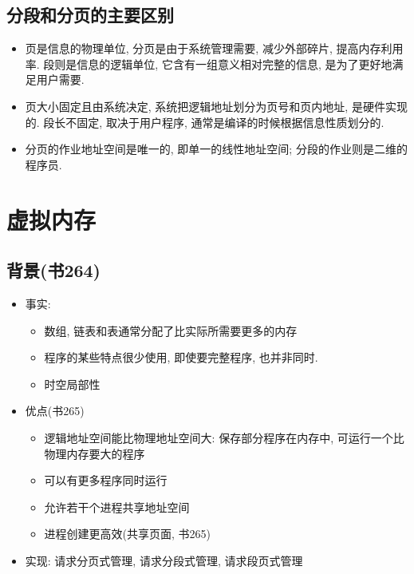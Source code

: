 \documentclass[a4paper, UTF8]{article}
\begin{document}
\subsection{分段和分页的主要区别}
\begin{itemize}
\item 页是信息的物理单位, 分页是由于系统管理需要, 减少外部碎片, 提高内存利用率. 段则是信息的逻辑单位, 它含有一组意义相对完整的信息, 是为了更好地满足用户需要.
\item 页大小固定且由系统决定, 系统把逻辑地址划分为页号和页内地址, 是硬件实现的. 段长不固定, 取决于用户程序, 通常是编译的时候根据信息性质划分的.
\item 分页的作业地址空间是唯一的, 即单一的线性地址空间; 分段的作业则是二维的程序员.
\end{itemize}
\newpage
\section{虚拟内存}
\subsection{背景(书264)}
\begin{itemize}
\item 事实:
	\begin{itemize}
	\item 数组, 链表和表通常分配了比实际所需要更多的内存
	\item 程序的某些特点很少使用, 即使要完整程序, 也并非同时.
	\item 时空局部性
	\end{itemize}
\item 优点(书265)
	\begin{itemize}
	\item 逻辑地址空间能比物理地址空间大: 保存部分程序在内存中, 可运行一个比物理内存要大的程序
	\item 可以有更多程序同时运行
	\item 允许若干个进程共享地址空间
	\item 进程创建更高效(共享页面, 书265)
	\end{itemize}
\item 实现: 请求分页式管理, 请求分段式管理, 请求段页式管理
\end{itemize}
\end{document}
